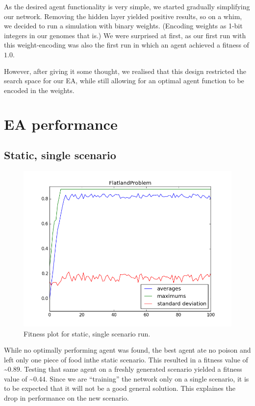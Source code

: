 \documentclass[twoside]{article}
\begin{document}
\begin{multicols}{2}
  As the desired agent functionality is very simple, we started gradually simplifying our network.
  Removing the hidden layer yielded positive results, so on a whim, we decided to run a simulation with binary weights.
  (Encoding weights as 1-bit integers in our genomes that is.)
  We were surprised at first, as our first run with this weight-encoding was also the first run in which an agent achieved a fitness of $1.0$.

  However, after giving it some thought, we realised that this design restricted the search space for our EA, while still allowing for an optimal agent function to be encoded in the weights.


  \section{EA performance}

  \subsection{Static, single scenario}

  \begin{figure}[H]
    \centering
    \includegraphics[width=\linewidth]{images/static_1.png}
    \caption{Fitness plot for static, single scenario run.} \label{fig:static-single}
  \end{figure}

  While no optimally performing agent was found, the best agent ate no poison and left only one piece of food inthe static scenario.
  This resulted in a fitness value of \textasciitilde $0.89$.
  Testing that same agent on a freshly generated scenario yielded a fitness value of \textasciitilde $0.44$.
  Since we are ``training'' the network only on a single scenario, it is to be expected that it will not be a good general solution.
  This explaines the drop in performance on the new scenario.
  

\end{multicols}
\end{document}
